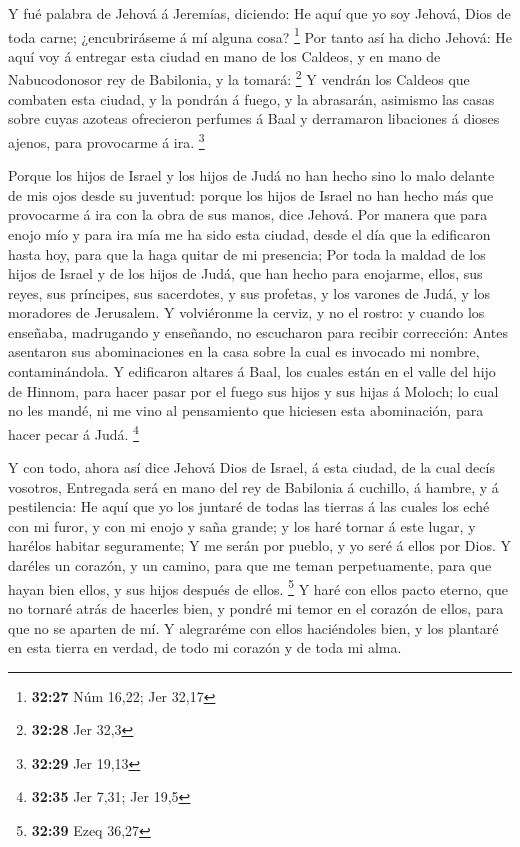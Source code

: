  Y fué palabra de Jehová á Jeremías, diciendo:
 He aquí que yo soy Jehová, Dios de toda carne;
¿encubriráseme á mí alguna cosa? \footnote{\textbf{32:27} Núm 16,22; Jer
  32,17}  Por tanto así ha dicho Jehová: He aquí voy á
entregar esta ciudad en mano de los Caldeos, y en mano de Nabucodonosor
rey de Babilonia, y la tomará: \footnote{\textbf{32:28} Jer 32,3}
 Y vendrán los Caldeos que combaten esta ciudad, y la
pondrán á fuego, y la abrasarán, asimismo las casas sobre cuyas azoteas
ofrecieron perfumes á Baal y derramaron libaciones á dioses ajenos, para
provocarme á ira. \footnote{\textbf{32:29} Jer 19,13}

 Porque los hijos de Israel y los hijos de Judá no han
hecho sino lo malo delante de mis ojos desde su juventud: porque los
hijos de Israel no han hecho más que provocarme á ira con la obra de sus
manos, dice Jehová.  Por manera que para enojo mío y para
ira mía me ha sido esta ciudad, desde el día que la edificaron hasta
hoy, para que la haga quitar de mi presencia;  Por toda
la maldad de los hijos de Israel y de los hijos de Judá, que han hecho
para enojarme, ellos, sus reyes, sus príncipes, sus sacerdotes, y sus
profetas, y los varones de Judá, y los moradores de Jerusalem.
 Y volviéronme la cerviz, y no el rostro: y cuando los
enseñaba, madrugando y enseñando, no escucharon para recibir corrección:
 Antes asentaron sus abominaciones en la casa sobre la
cual es invocado mi nombre, contaminándola.  Y edificaron
altares á Baal, los cuales están en el valle del hijo de Hinnom, para
hacer pasar por el fuego sus hijos y sus hijas á Moloch; lo cual no les
mandé, ni me vino al pensamiento que hiciesen esta abominación, para
hacer pecar á Judá. \footnote{\textbf{32:35} Jer 7,31; Jer 19,5}

 Y con todo, ahora así dice Jehová Dios de Israel, á esta
ciudad, de la cual decís vosotros, Entregada será en mano del rey de
Babilonia á cuchillo, á hambre, y á pestilencia:  He aquí
que yo los juntaré de todas las tierras á las cuales los eché con mi
furor, y con mi enojo y saña grande; y los haré tornar á este lugar, y
harélos habitar seguramente;  Y me serán por pueblo, y yo
seré á ellos por Dios.  Y daréles un corazón, y un
camino, para que me teman perpetuamente, para que hayan bien ellos, y
sus hijos después de ellos. \footnote{\textbf{32:39} Ezeq 36,27}
 Y haré con ellos pacto eterno, que no tornaré atrás de
hacerles bien, y pondré mi temor en el corazón de ellos, para que no se
aparten de mí.  Y alegraréme con ellos haciéndoles bien,
y los plantaré en esta tierra en verdad, de todo mi corazón y de toda mi
alma.

